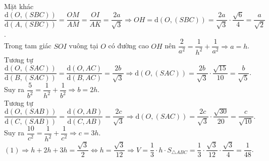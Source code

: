 \begin{ex}
{{
		} 
		\noindent Mặt khác $\dfrac{\mathrm{d}(O,(SBC))}{\mathrm{d}(A,(SBC))}=\dfrac{OM}{AM}=\dfrac{OI}{AK}=\dfrac{2a}{\sqrt{3}} \Rightarrow OH=\mathrm{d}(O,(SBC))=\dfrac{2a}{\sqrt{3}} \cdot \dfrac{\sqrt{6}}{4}=\dfrac{a}{\sqrt{2}}$.\\ 
		Trong tam giác $SOI$ vuông tại $O$ có đường cao $OH$ nên $\dfrac{2}{a^2}=\dfrac{1}{h^2}+\dfrac{1}{a^2} \Rightarrow a=h$.\\ 
		Tương tự $\dfrac{\mathrm{d}(O,(SAC))}{\mathrm{d}(B,(SAC))}=\dfrac{\mathrm{d}(O,AC)}{\mathrm{d}(B,AC)}=\dfrac{2b}{\sqrt{3}} \Rightarrow \mathrm{d}(O,(SAC))=\dfrac{2b}{\sqrt{3}} \cdot \dfrac{\sqrt{15}}{10}=\dfrac{b}{\sqrt{5}}$.\\ 
		Suy ra $\dfrac{5}{b^2}=\dfrac{1}{h^2}+\dfrac{1}{b^2}  \Rightarrow b=2h$.\\
		Tương tự $\dfrac{\mathrm{d}(O,(SAB))}{\mathrm{d}(C,(SAB))}=\dfrac{\mathrm{d}(O,AB)}{\mathrm{d}(C,AB)}=\dfrac{2c}{\sqrt{3}} \Rightarrow \mathrm{d}(O,(SAC))=\dfrac{2c}{\sqrt{3}}  \cdot \dfrac{\sqrt{30}}{20}=\dfrac{c}{\sqrt{10}}$.\\
		Suy  ra $\dfrac{10}{c^2}=\dfrac{1}{h^2}+\dfrac{1}{c^2} \Rightarrow c=3h$.\\
	$(1) \Rightarrow h+2h+3h=\dfrac{\sqrt{3}}{2} \Leftrightarrow h=\dfrac{\sqrt{3}}{12} \Rightarrow V=\dfrac{1}{3} \cdot h \cdot S_{\triangle ABC}=\dfrac{1}{3}\cdot\dfrac{\sqrt{3}}{12}\cdot\dfrac{\sqrt{3}}{4}=\dfrac{1}{48}$.} 
\end{ex}

